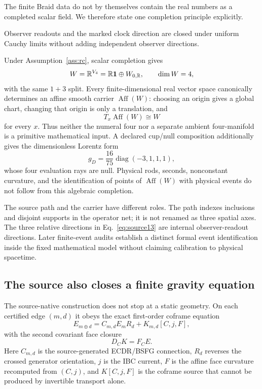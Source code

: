 The finite Braid data do not by themselves contain the real numbers as a completed scalar field. We therefore state one completion principle explicitly.
\begin{assumption}\label{ass:rc}
Observer readouts and the marked clock direction are closed under uniform Cauchy limits without adding independent observer directions.
\end{assumption}
Under Assumption~\ref{ass:rc}, scalar completion gives
\begin{equation}\label{eq:affinecompletion}
 W=\mathbb R^{V_4}=\mathbb R\mathbf{1}\oplus W_{0,\mathbb R},
 \qquad \dim W=4,
\end{equation}
with the same $1+3$ split. Every finite-dimensional real vector space canonically determines an affine smooth carrier $\operatorname{Aff}(W)$: choosing an origin gives a global chart, changing that origin is only a translation, and
\begin{equation}\label{eq:tangentW}
 T_x\operatorname{Aff}(W)\cong W
\end{equation}
for every $x$. Thus neither the numeral four nor a separate ambient four-manifold is a primitive mathematical input. A declared cup/null composition additionally gives the dimensionless Lorentz form
\begin{equation}\label{eq:cupmetric}
 g_D=\frac{16}{75}\operatorname{diag}(-3,1,1,1),
\end{equation}
whose four evaluation rays are null. Physical rods, seconds, nonconstant curvature, and the identification of points of $\operatorname{Aff}(W)$ with physical events do not follow from this algebraic completion.

The source path and the carrier have different roles. The path indexes inclusions and disjoint supports in the operator net; it is not renamed as three spatial axes. The three relative directions in Eq.~\eqref{eq:source13} are internal observer-readout directions. Later finite-event audits establish a distinct formal event identification inside the fixed mathematical model without claiming calibration to physical spacetime.

\subsection{The source also closes a finite gravity equation}

The source-native construction does not stop at a static geometry. On each certified edge $(m,d)$ it obeys the exact first-order coframe equation
\begin{equation}\label{eq:finitegravity}
 E_{m\oplus d}=C_{m,d}E_mR_d+K_{m,d}[C,j,F],
\end{equation}
with the second covariant face closure
\begin{equation}\label{eq:curvatureclosure}
 D_CK=F_CE.
\end{equation}
Here $C_{m,d}$ is the source-generated ECDR/BSFG connection, $R_d$ reverses the crossed generator orientation, $j$ is the IBC current, $F$ is the affine face curvature recomputed from $(C,j)$, and $K[C,j,F]$ is the coframe source that cannot be produced by invertible transport alone.

